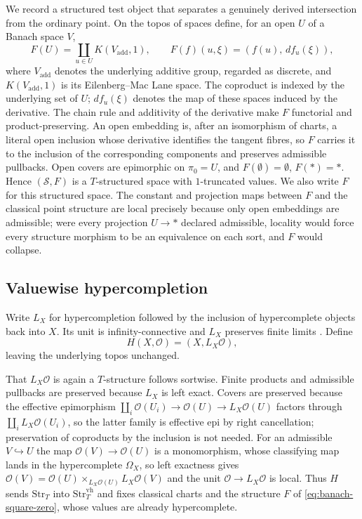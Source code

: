 \documentclass[12pt]{amsart}
\theoremstyle{definition}
\theoremstyle{remark}
\numberwithin{equation}{section}
\begin{document}
We record a structured test object that separates a genuinely
derived intersection from the ordinary point. On the topos of
spaces define, for an open $U$ of a Banach space $V$,
\begin{equation}
\label{eq:banach-square-zero}
 F(U)=\coprod_{u\in U}K(V_{\mathrm{add}},1),
 \qquad
 F(f)(u,\xi)=(f(u),\,df_u(\xi)),
\end{equation}
where $V_{\mathrm{add}}$ denotes the underlying additive group,
regarded as discrete, and $K(V_{\mathrm{add}},1)$ is its
Eilenberg--Mac Lane space. The coproduct is indexed by the
underlying set of $U$; $df_u(\xi)$ denotes the map of these
spaces induced by the derivative. The chain rule and additivity
of the derivative
\cite[Lemma~1.2.9 and Proposition~1.2.10, p.~17]{Schmeding2021}
make $F$ functorial and
product-preserving. An open embedding is, after an isomorphism of
charts, a literal open inclusion whose derivative identifies the
tangent fibres, so $F$ carries it to the inclusion of the
corresponding components and preserves admissible pullbacks. Open
covers are epimorphic on $\pi_0=U$, and $F(\emptyset)=\emptyset$,
$F(*)=*$. Hence $(\mathcal S,F)$ is a $T$-structured space with
$1$-truncated values. We also write $F$ for this structured space.
The constant and projection maps
between $F$ and the classical point structure are local precisely
because only open embeddings are admissible; were every projection
$U\to*$ declared admissible, locality would force every structure
morphism to be an equivalence on each sort, and $F$ would collapse.

\subsection{Valuewise hypercompletion}
\label{subsec:banach-hypercompletion}

Write $L_X$ for hypercompletion followed by the inclusion of
hypercomplete objects back into $X$. Its unit is infinity-connective
and $L_X$ preserves finite limits
\cite[pp.~668--669]{LurieHTT2009}. Define
\begin{equation}
\label{eq:banach-H}
 H(X,\mathcal O)=(X,L_X\mathcal O),
\end{equation}
leaving the underlying topos unchanged.

That $L_X\mathcal O$ is again a $T$-structure follows sortwise.
Finite products and admissible pullbacks are preserved because
$L_X$ is left exact. Covers are preserved because the effective
epimorphism
$\coprod_i\mathcal O(U_i)\to\mathcal O(U)\to L_X\mathcal O(U)$ factors
through $\coprod_i L_X\mathcal O(U_i)$, so the latter family is
effective epi by right cancellation; preservation of coproducts by
the inclusion is not needed. For an admissible $V\hookrightarrow U$
the map $\mathcal O(V)\to\mathcal O(U)$ is a monomorphism, whose
classifying map lands in the hypercomplete
$\Omega_X$, so left exactness gives
$\mathcal O(V)=\mathcal O(U)\times_{L_X\mathcal O(U)}L_X\mathcal O(V)$
and the unit $\mathcal O\to L_X\mathcal O$ is local. Thus $H$ sends
$\mathrm{Str}_T$ into $\mathrm{Str}_T^{\mathrm{vh}}$ and fixes
classical charts and the structure $F$ of
\eqref{eq:banach-square-zero}, whose values are already
hypercomplete.
\end{document}

